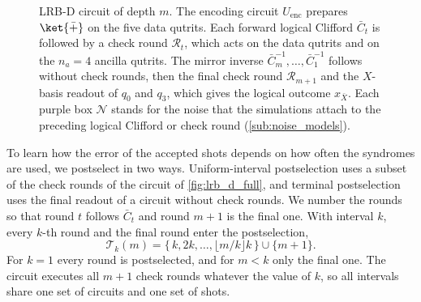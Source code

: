 \begin{figure}[htb]
    \centering
    \caption{LRB-D circuit of depth $m$. The encoding circuit $U_{\mathrm{enc}}$ prepares $\ket{\bar +}$ on the five data qutrits. Each forward logical Clifford $\bar C_t$ is followed by a check round $\mathcal{R}_t$, which acts on the data qutrits and on the $n_a = 4$ ancilla qutrits. The mirror inverse $\bar C_m^{-1}, \dots, \bar C_1^{-1}$ follows without check rounds, then the final check round $\mathcal{R}_{m+1}$ and the $X$-basis readout of $q_0$ and $q_3$, which gives the logical outcome $x_{\bar X}$. Each purple box $\mathcal{N}$ stands for the noise that the simulations attach to the preceding logical Clifford or check round (\autoref{sub:noise_models}).}
    \label{fig:lrb_d_full}\label{fig:lrb_a}
\end{figure}

To learn how the error of the accepted shots depends on how often the syndromes are used, we postselect in two ways. Uniform-interval postselection uses a subset of the check rounds of the circuit of \autoref{fig:lrb_d_full}, and terminal postselection uses the final readout of a circuit without check rounds. We number the rounds so that round $t$ follows $\bar C_t$ and round $m+1$ is the final one. With interval $k$, every $k$-th round and the final round enter the postselection,
\begin{equation}
    \mathcal{T}_k(m) = \{\, k, 2k, \dots, \lfloor m/k \rfloor k \,\} \cup \{ m+1 \} .
    \label{eq:unif_rounds}
\end{equation}
For $k = 1$ every round is postselected, and for $m < k$ only the final one. The circuit executes all $m+1$ check rounds whatever the value of $k$, so all intervals share one set of circuits and one set of shots.

